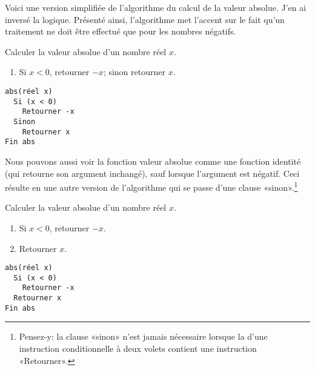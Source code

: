 Voici une version simplifiée de l'algorithme du calcul de la valeur
absolue. J'en ai inversé la logique. Présenté ainsi, l'algorithme met
l'accent sur le fait qu'un traitement ne doit être effectué que pour
les nombres négatifs.

\begin{algorithmebis}
  \label{algo:algorithmes:abs:simplifie}
  Calculer la valeur absolue d'un nombre réel $x$.

  \noindent
  \begin{minipage}[t]{0.48\linewidth}
    \begin{enumerate}
    \item Si $x < 0$, retourner $-x$; sinon retourner $x$.
    \end{enumerate}
  \end{minipage}
  \hfill
  \begin{minipage}[t]{0.48\linewidth}
    \begin{Schunk}
\begin{Verbatim}
abs(réel x)
  Si (x < 0)
    Retourner -x
  Sinon
    Retourner x
Fin abs
\end{Verbatim}
    \end{Schunk}
  \end{minipage}
\end{algorithmebis}

Nous pouvons aussi voir la fonction valeur absolue comme une fonction
identité (qui retourne son argument inchangé), sauf lorsque l'argument
est négatif. Ceci résulte en une autre version de l'algorithme qui se
passe d'une clause «sinon».\footnote{%
  Pensez-y: la clause «sinon» n'est jamais nécessaire lorsque la
   d'une instruction conditionnelle à deux volets
  contient une instruction «Retourner».}

\begin{algorithmebis}
  \label{algo:algorithmes:abs:simplifie:bis}
  Calculer la valeur absolue d'un nombre réel $x$.

  \noindent
  \begin{minipage}[t]{0.48\linewidth}
    \begin{enumerate}
    \item Si $x < 0$, retourner $-x$.
    \item Retourner $x$.
    \end{enumerate}
  \end{minipage}
  \hfill
  \begin{minipage}[t]{0.48\linewidth}
    \begin{Schunk}
\begin{Verbatim}
abs(réel x)
  Si (x < 0)
    Retourner -x
  Retourner x
Fin abs
\end{Verbatim}
    \end{Schunk}
  \end{minipage}
\end{algorithmebis}


